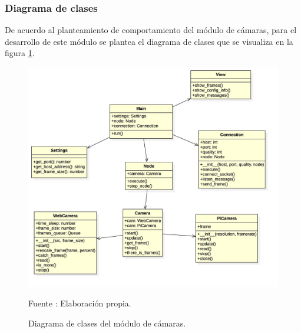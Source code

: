 \subsubsection{Diagrama de clases}
De acuerdo al planteamiento de comportamiento del módulo de cámaras, para el desarrollo de este módulo se plantea el diagrama de clases que se visualiza en la figura \ref{fig:camera_clases}.\\

\begin{figure}[H]
    \begin{center}
        \includegraphics[width=15cm]{img/capitulo_4/camera_clases.jpg}
        \caption{Diagrama de clases del módulo de cámaras.}
        Fuente : Elaboración propia.
        \label{fig:camera_clases}
    \end{center}
\end{figure}

